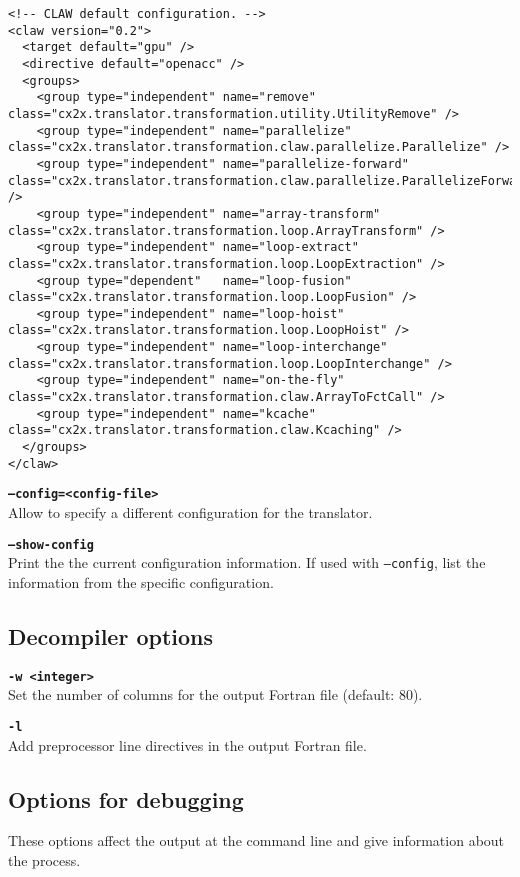 \documentclass{article}
\begin{document}
\begin{lstlisting}
<!-- CLAW default configuration. -->
<claw version="0.2">
  <target default="gpu" />
  <directive default="openacc" />
  <groups>
    <group type="independent" name="remove"              class="cx2x.translator.transformation.utility.UtilityRemove" />
    <group type="independent" name="parallelize"         class="cx2x.translator.transformation.claw.parallelize.Parallelize" />
    <group type="independent" name="parallelize-forward" class="cx2x.translator.transformation.claw.parallelize.ParallelizeForward" />
    <group type="independent" name="array-transform"     class="cx2x.translator.transformation.loop.ArrayTransform" />
    <group type="independent" name="loop-extract"        class="cx2x.translator.transformation.loop.LoopExtraction" />
    <group type="dependent"   name="loop-fusion"         class="cx2x.translator.transformation.loop.LoopFusion" />
    <group type="independent" name="loop-hoist"          class="cx2x.translator.transformation.loop.LoopHoist" />
    <group type="independent" name="loop-interchange"    class="cx2x.translator.transformation.loop.LoopInterchange" />
    <group type="independent" name="on-the-fly"          class="cx2x.translator.transformation.claw.ArrayToFctCall" />
    <group type="independent" name="kcache"              class="cx2x.translator.transformation.claw.Kcaching" />
  </groups>
</claw>
\end{lstlisting}

\textbf{\texttt{--config=<config-file>}}\\
Allow to specify a different configuration for the translator.

\textbf{\texttt{--show-config}}\\
Print the the current configuration information. If used with \texttt{--config}, list the information from the specific configuration.

\subsection{Decompiler options}
\textbf{\texttt{-w <integer>}}\\
Set the number of columns for the output Fortran file (default: 80).

\textbf{\texttt{-l}}\\
Add preprocessor line directives in the output Fortran file.

\subsection{Options for debugging}
These options affect the output at the command line and give information about the process. 
\end{document}

